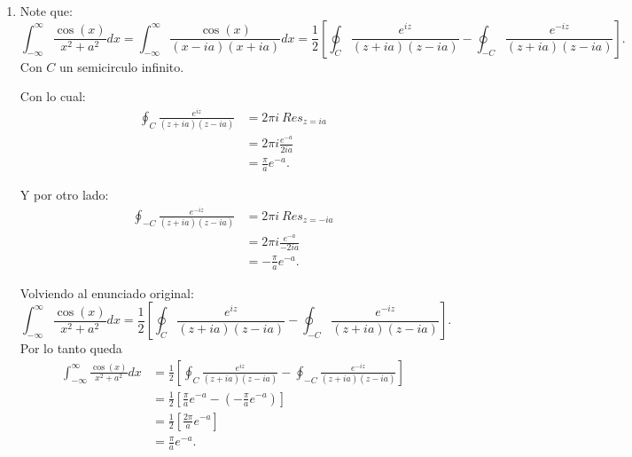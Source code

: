 \documentclass{report}
\begin{document}
\begin{enumerate}
  \item Note que: \[
      \displaystyle\int_{-\infty}^{\infty}\frac{\cos\left( x \right) }{x^2 + a^2}dx = \displaystyle\int_{-\infty}^{\infty}\frac{\cos\left( x \right) }{\left( x - ia \right)\left( x + ia \right)  }dx = \frac{1}{2} \left[\oint_{C}   \frac{e^{iz}}{\left( z + ia \right) \left( z - ia \right) } - \oint_{-C} \frac{e^{-iz}}{\left( z + ia \right) \left( z - ia \right) }\right] .\] Con $C$ un semicirculo infinito.

    Con lo cual:
    \begin{align*}
      \oint_{C} \frac{e^{iz}}{\left( z + ia \right) \left( z - ia \right) } &= 2\pi i\ Res_{z = ia} \\ 
      &= 2 \pi i \frac{e^{-a}}{2ia} \\
      &= \frac{\pi}{a} e^{-a}
    .\end{align*}

    Y por otro lado:
    \begin{align*}
      \oint_{-C} \frac{e^{-iz}}{\left( z + ia \right) \left( z - ia \right) } &= 2\pi i\ Res_{z = -ia} \\ 
      &= 2 \pi i \frac{e^{-a}}{-2ia} \\
      &= - \frac{\pi}{a} e^{-a}
    .\end{align*}

    Volviendo al enunciado original: \[
      \displaystyle\int_{-\infty}^{\infty}\frac{\cos\left( x \right) }{x^2 + a^2}dx = \frac{1}{2} \left[\oint_{C}   \frac{e^{iz}}{\left( z + ia \right) \left( z - ia \right) } - \oint_{-C} \frac{e^{-iz}}{\left( z + ia \right) \left( z - ia \right) }\right]
      .\] Por lo tanto queda
    \begin{align*}
      \displaystyle\int_{-\infty}^{\infty}\frac{\cos\left( x \right) }{x^2 + a^2}dx &= \frac{1}{2} \left[\oint_{C}   \frac{e^{iz}}{\left( z + ia \right) \left( z - ia \right) } - \oint_{-C} \frac{e^{-iz}}{\left( z + ia \right) \left( z - ia \right) }\right]\\
      &= \frac{1}{2}\left[ \frac{\pi}{a}e^{-a} - \left( - \frac{\pi}{a}e^{-a} \right)  \right]  \\
      &= \frac{1}{2}\left[ \frac{2\pi}{a}e^{-a} \right]  \\
      &= \frac{\pi}{a}e^{-a}
    .\end{align*}


\end{enumerate}
\end{document}

